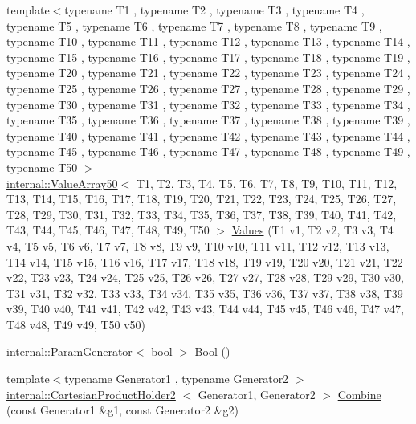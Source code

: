 \begin{DoxyCompactItemize}
\item 
{\footnotesize template$<$typename T1 , typename T2 , typename T3 , typename T4 , typename T5 , typename T6 , typename T7 , typename T8 , typename T9 , typename T10 , typename T11 , typename T12 , typename T13 , typename T14 , typename T15 , typename T16 , typename T17 , typename T18 , typename T19 , typename T20 , typename T21 , typename T22 , typename T23 , typename T24 , typename T25 , typename T26 , typename T27 , typename T28 , typename T29 , typename T30 , typename T31 , typename T32 , typename T33 , typename T34 , typename T35 , typename T36 , typename T37 , typename T38 , typename T39 , typename T40 , typename T41 , typename T42 , typename T43 , typename T44 , typename T45 , typename T46 , typename T47 , typename T48 , typename T49 , typename T50 $>$ }\\\hyperlink{classtesting_1_1internal_1_1ValueArray50}{internal\-::\-Value\-Array50}$<$ \-T1, \-T2, \*
\-T3, \-T4, \-T5, \-T6, \-T7, \-T8, \-T9, \*
\-T10, \-T11, \-T12, \-T13, \-T14, \-T15, \*
\-T16, \-T17, \-T18, \-T19, \-T20, \-T21, \*
\-T22, \-T23, \-T24, \-T25, \-T26, \-T27, \*
\-T28, \-T29, \-T30, \-T31, \-T32, \-T33, \*
\-T34, \-T35, \-T36, \-T37, \-T38, \-T39, \*
\-T40, \-T41, \-T42, \-T43, \-T44, \-T45, \*
\-T46, \-T47, \-T48, \-T49, \-T50 $>$ \hyperlink{namespacetesting_a7b6008393a1fa7b55b07fbad67c1c811}{\-Values} (\-T1 v1, \-T2 v2, \-T3 v3, \-T4 v4, \-T5 v5, \-T6 v6, \-T7 v7, \-T8 v8, \-T9 v9, \-T10 v10, \-T11 v11, \-T12 v12, \-T13 v13, \-T14 v14, \-T15 v15, \-T16 v16, \-T17 v17, \-T18 v18, \-T19 v19, \-T20 v20, \-T21 v21, \-T22 v22, \-T23 v23, \-T24 v24, \-T25 v25, \-T26 v26, \-T27 v27, \-T28 v28, \-T29 v29, \-T30 v30, \-T31 v31, \-T32 v32, \-T33 v33, \-T34 v34, \-T35 v35, \-T36 v36, \-T37 v37, \-T38 v38, \-T39 v39, \-T40 v40, \-T41 v41, \-T42 v42, \-T43 v43, \-T44 v44, \-T45 v45, \-T46 v46, \-T47 v47, \-T48 v48, \-T49 v49, \-T50 v50)
\item 
\hyperlink{classtesting_1_1internal_1_1ParamGenerator}{internal\-::\-Param\-Generator}$<$ bool $>$ \hyperlink{namespacetesting_aa9f9150ed43f949c8a6bacf3f04c03ce}{\-Bool} ()
\item 
{\footnotesize template$<$typename Generator1 , typename Generator2 $>$ }\\\hyperlink{classtesting_1_1internal_1_1CartesianProductHolder2}{internal\-::\-Cartesian\-Product\-Holder2}\*
$<$ \-Generator1, \-Generator2 $>$ \hyperlink{namespacetesting_a4917922963bacef3e301e67366c41df3}{\-Combine} (const \-Generator1 \&g1, const \-Generator2 \&g2)
\item 

\end{DoxyCompactItemize}
